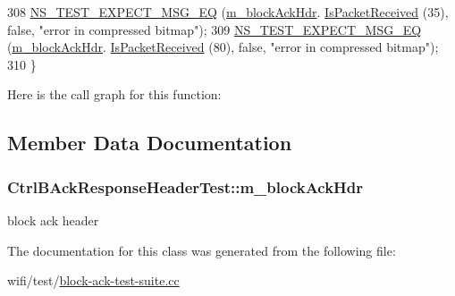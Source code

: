 \begin{DoxyCode}
308   \hyperlink{group__testing_ga7304ba46a28d8cf08dfdfd6499cf7068}{NS\_TEST\_EXPECT\_MSG\_EQ} (\hyperlink{classCtrlBAckResponseHeaderTest_a1319fff4c2f7b2dcb378f52026174c84}{m\_blockAckHdr}.
      \hyperlink{classns3_1_1CtrlBAckResponseHeader_ae42de686eccef343a48a7541a4afe148}{IsPacketReceived} (35), \textcolor{keyword}{false}, \textcolor{stringliteral}{"error in compressed bitmap"});
309   \hyperlink{group__testing_ga7304ba46a28d8cf08dfdfd6499cf7068}{NS\_TEST\_EXPECT\_MSG\_EQ} (\hyperlink{classCtrlBAckResponseHeaderTest_a1319fff4c2f7b2dcb378f52026174c84}{m\_blockAckHdr}.
      \hyperlink{classns3_1_1CtrlBAckResponseHeader_ae42de686eccef343a48a7541a4afe148}{IsPacketReceived} (80), \textcolor{keyword}{false}, \textcolor{stringliteral}{"error in compressed bitmap"});
310 \}
\end{DoxyCode}


Here is the call graph for this function\+:




\subsection{Member Data Documentation}
\subsubsection[{\texorpdfstring{m\+\_\+block\+Ack\+Hdr}{m_blockAckHdr}}]{ Ctrl\+B\+Ack\+Response\+Header\+Test\+::m\+\_\+block\+Ack\+Hdr\hspace{0.3cm}{\ttfamily [private]}}\hypertarget{classCtrlBAckResponseHeaderTest_a1319fff4c2f7b2dcb378f52026174c84}{}\label{classCtrlBAckResponseHeaderTest_a1319fff4c2f7b2dcb378f52026174c84}


block ack header 



The documentation for this class was generated from the following file\+:\begin{DoxyCompactItemize}
\item 
wifi/test/\hyperlink{block-ack-test-suite_8cc}{block-\/ack-\/test-\/suite.\+cc}\end{DoxyCompactItemize}
